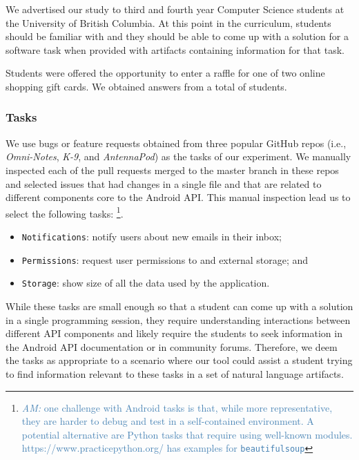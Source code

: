 We advertised our study to third and fourth year Computer Science students at the University of British Columbia. 
At this point in the curriculum, students should be familiar with  and they should be able to come up with a solution 
for a software task when provided with artifacts containing information for that task.


Students were offered the opportunity to enter a raffle for one of two  online shopping gift cards.
We obtained answers from a total of \red{\#} students. 



\subsubsection{Tasks}

We use bugs or feature requests obtained from three popular  GitHub repos (i.e., \textit{Omni-Notes}, \textit{K-9}, and \textit{AntennaPod}) as the tasks of our experiment. 
We manually inspected each of the pull requests merged to the master branch in these repos and selected issues that had changes in a single file and that are related to different components core to the Android API.
This manual inspection lead us to select the following tasks:
\footnote{
\textcolor{steelblue}{{\textit{AM:} one challenge with Android tasks is that, while more representative, they are harder to debug and test in a self-contained environment.
A potential alternative are Python tasks that require using well-known modules. https://www.practicepython.org/ has examples for \texttt{beautifulsoup}}}}.




\begin{itemize}
    \item \texttt{Notifications}: notify users about new emails in their inbox;
    \item \texttt{Permissions}: request user permissions to and external storage; and
    \item \texttt{Storage}: show size of all the data used by the application.
\end{itemize}


While these tasks are small enough so that a student can come up with a solution in a single programming session,
they require understanding interactions between different API components 
and likely require the students to seek information in the Android API documentation or in community forums. 
Therefore, we deem the tasks as appropriate to a scenario where our tool could assist a student trying to find information relevant to these tasks in a set of natural language artifacts. 


